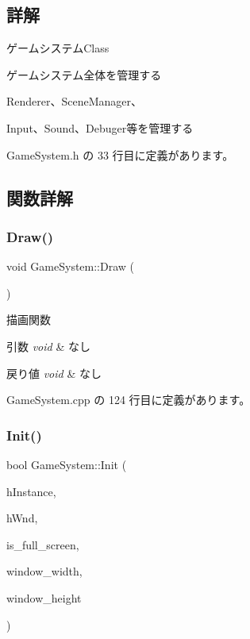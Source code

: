 \subsection{詳解}
ゲームシステム\+Class 

ゲームシステム全体を管理する

Renderer、\+Scene\+Manager、

Input、\+Sound、\+Debuger等を管理する 

 Game\+System.\+h の 33 行目に定義があります。



\subsection{関数詳解}
\mbox{\label{class_game_system_a474db0066b23d39e94e0a830140edce5}} 
\subsubsection{\texorpdfstring{Draw()}{Draw()}}
{\footnotesize\ttfamily void Game\+System\+::\+Draw (\begin{DoxyParamCaption}{ }\end{DoxyParamCaption})}



描画関数 


\begin{DoxyParams}{引数}
{\em void} & なし \\
\hline
\end{DoxyParams}

\begin{DoxyRetVals}{戻り値}
{\em void} & なし \\
\hline
\end{DoxyRetVals}


 Game\+System.\+cpp の 124 行目に定義があります。

\mbox{\label{class_game_system_ad4c08500b98490e00ce87a770bb5e981}} 
\subsubsection{\texorpdfstring{Init()}{Init()}}
{\footnotesize\ttfamily bool Game\+System\+::\+Init (\begin{DoxyParamCaption}\item[{H\+I\+N\+S\+T\+A\+N\+CE}]{h\+Instance,  }\item[{H\+W\+ND}]{h\+Wnd,  }\item[{B\+O\+OL}]{is\+\_\+full\+\_\+screen,  }\item[{int}]{window\+\_\+width,  }\item[{int}]{window\+\_\+height }\end{DoxyParamCaption})}



